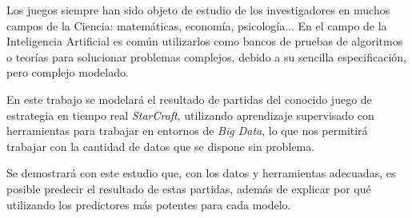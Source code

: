 Los juegos siempre han sido objeto de estudio de los investigadores en
muchos campos de la Ciencia: matemáticas, economía, psicología... En el campo
de la Inteligencia Artificial es común utilizarlos como bancos de pruebas
de algoritmos o teorías para solucionar problemas complejos, debido a su
sencilla especificación, pero complejo modelado.

En este trabajo se modelará el resultado de partidas del conocido juego de
estrategia en tiempo real \emph{StarCraft}, utilizando aprendizaje supervisado
con herramientas para trabajar en entornos de \emph{Big Data}, lo que nos
permitirá trabajar con la cantidad de datos que se dispone sin problema.

Se demostrará con este estudio que, con los datos y herramientas adecuadas,
es posible predecir el resultado de estas partidas, además de explicar por qué
utilizando los predictores más potentes para cada modelo. 

